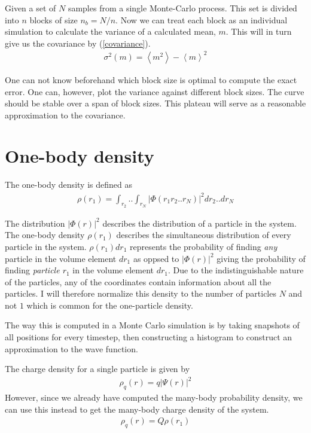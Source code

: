 \documentclass[a4paper, 12pt, titlepage]{article}
\begin{document}
 Given a set of $N$ samples from a single Monte-Carlo process. This set is divided into $n$ blocks of size $n_b = N/n$. Now we can treat each block as an individual simulation to calculate the variance of a calculated mean, $m$. This will in turn give us the covariance by (\ref{covariance}).
 \begin{align*}
 	\sigma^2 (m) = \left<m^2\right> - \left<m\right>^2 
 \end{align*}

 One can not know beforehand which block size is optimal to compute the exact error. One can, however, plot the variance against different block sizes. The curve should be stable over a span of block sizes. This plateau will serve as a reasonable approximation to the covariance. 

\section*{One-body density}
 The one-body density is defined as
 \begin{align*}
 	\rho(r_1) = \int_{r_2} .. \int_{r_N} | \Phi(r_1 r_2 .. r_N) |^2 dr_2 .. dr_N
 \end{align*}

 The distribution $|\Phi(r)|^2$ describes the distribution of a particle in the system. The one-body density $\rho(r_1)$ describes the simultaneous distribution of every particle in the system. $\rho(r_1) dr_1 $ represents the probability of finding \textit{any} particle in the volume element $dr_1$ as oppsed to $|\Phi(r)|^2$ giving the probability of finding \textit{particle $r_1$} in the volume element $dr_1$. Due to the indistinguishable nature of the particles, any of the coordinates contain information about all the particles. I will therefore normalize this density to the number of particles $N$ and not $1$ which is common for the one-particle density. 

 The way this is computed in a Monte Carlo simulation is by taking snapshots of all positions for every timestep, then constructing a histogram to construct an approximation to the wave function.

 The charge density for a single particle is given by 
 \begin{align*}
 	\rho_q (r) = q |\Psi(r)|^2
 \end{align*}
 However, since we already have computed the many-body probability density, we can use this instead to get the many-body charge density of the system. 
 \begin{align*}
 	\rho_q (r) = Q \rho(r_1)
 \end{align*}
\end{document}
